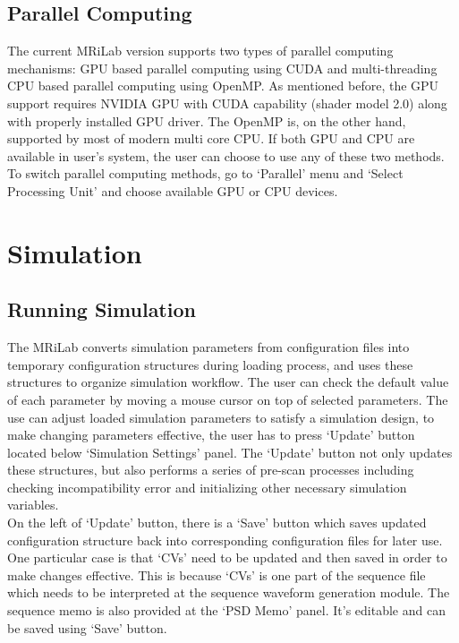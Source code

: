 \documentclass{book}%
\begin{document}
\section{Parallel Computing}

The current MRiLab version supports two types of parallel computing mechanisms: GPU based parallel computing using CUDA and multi-threading CPU based parallel computing using OpenMP. As mentioned before, the GPU support requires NVIDIA GPU with CUDA capability (shader model 2.0) along with properly installed GPU driver. The OpenMP is, on the other hand, supported by most of modern multi core CPU. If both GPU and CPU are available in user's system, the user can choose to use any of these two methods. To switch parallel computing methods, go to `Parallel' menu and `Select Processing Unit' and choose available GPU or CPU devices.

\chapter{Simulation}

\section{Running Simulation}

The MRiLab converts simulation parameters from configuration files into temporary configuration structures during loading process, and uses these structures to organize simulation workflow. The user can check the default value of each parameter by moving a mouse cursor on top of selected parameters. The use can adjust loaded simulation parameters to satisfy a simulation design, to make changing parameters effective, the user has to press `Update' button located below `Simulation Settings' panel. The `Update' button not only updates these structures, but also performs a series of pre-scan processes including checking incompatibility error and initializing other necessary simulation variables. \\

On the left of `Update' button, there is a `Save' button which saves updated configuration structure back into corresponding configuration files for later use. One particular case is that `CVs' need to be updated and then saved in order to make changes effective. This is because `CVs' is one part of the sequence file which needs to be interpreted at the sequence waveform generation module. The sequence memo is also provided at the `PSD Memo' panel. It's editable and can be saved using `Save' button. \\
\end{document}
